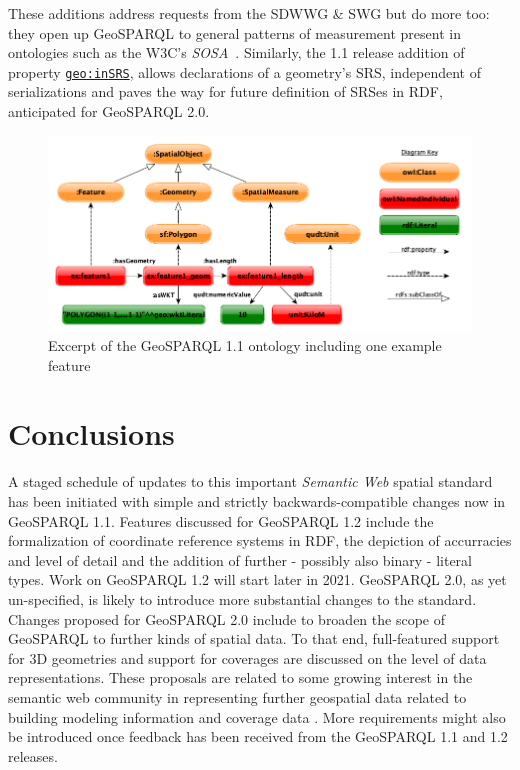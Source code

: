 \documentclass[runningheads]{llncs}
\begin{document}
These additions address requests from the SDWWG \& SWG but
do more too: they open up GeoSPARQL to general patterns of measurement present in ontologies 
such as the W3C's \textit{SOSA}~\cite{haller_semantic_2017}. Similarly, 
the 1.1 release addition of property \href{http://www.opengis.net/def/function/geosparql/inSRS}{\texttt{geo:inSRS}}, allows declarations of a geometry's SRS, independent of serializations and paves the way 
for future definition of SRSes in RDF, anticipated for GeoSPARQL 2.0.

\begin{figure}[htb]
    \centering
    \includegraphics[width=\linewidth]{images/geold_ontology.png}
    \caption{Excerpt of the GeoSPARQL 1.1 ontology including one example feature}
    \label{fig:geosparql11ontology}
\end{figure}

\section{Conclusions}\label{sec:conclusions}
A staged schedule of updates to this important \textit{Semantic Web} spatial standard has been initiated with simple and strictly backwards-compatible changes now in GeoSPARQL 1.1. Features discussed for GeoSPARQL 1.2 include the formalization of coordinate reference systems in RDF, the depiction of accurracies and level of detail and the addition of further - possibly also binary - literal types. Work on GeoSPARQL 1.2 will start later in 2021. GeoSPARQL 2.0, as yet un-specified, is likely to introduce more substantial changes to the standard. Changes proposed for GeoSPARQL 2.0 include to broaden the scope of GeoSPARQL to further kinds of spatial data. To that end, full-featured support for 3D geometries and support for coverages are discussed on the level of data representations. These proposals are related to some growing interest in the semantic web community in representing further geospatial data related to building modeling information \cite{zhang2018bimsparql} and coverage data \cite{homburg2020geosparql+}. More requirements might also be introduced once feedback has been received from the GeoSPARQL 1.1 and 1.2 releases.
\end{document}
